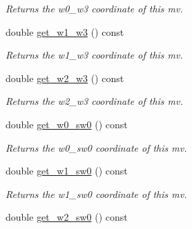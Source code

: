 \begin{DoxyCompactItemize}
\begin{DoxyCompactList}\small\item\em Returns the w0\-\_\-w3 coordinate of this mv. \end{DoxyCompactList}\item 
\hypertarget{classe3ga_1_1mv_ad4d23993e92930a758c5648d8a075906}{double \hyperlink{classe3ga_1_1mv_ad4d23993e92930a758c5648d8a075906}{get\-\_\-w1\-\_\-w3} () const }\label{classe3ga_1_1mv_ad4d23993e92930a758c5648d8a075906}

\begin{DoxyCompactList}\small\item\em Returns the w1\-\_\-w3 coordinate of this mv. \end{DoxyCompactList}\item 
\hypertarget{classe3ga_1_1mv_abb82d4e2452ad1c502a85f8ceaf8ea5b}{double \hyperlink{classe3ga_1_1mv_abb82d4e2452ad1c502a85f8ceaf8ea5b}{get\-\_\-w2\-\_\-w3} () const }\label{classe3ga_1_1mv_abb82d4e2452ad1c502a85f8ceaf8ea5b}

\begin{DoxyCompactList}\small\item\em Returns the w2\-\_\-w3 coordinate of this mv. \end{DoxyCompactList}\item 
\hypertarget{classe3ga_1_1mv_a7c407bfb8b338ae27b424d8b5bfd079c}{double \hyperlink{classe3ga_1_1mv_a7c407bfb8b338ae27b424d8b5bfd079c}{get\-\_\-w0\-\_\-sw0} () const }\label{classe3ga_1_1mv_a7c407bfb8b338ae27b424d8b5bfd079c}

\begin{DoxyCompactList}\small\item\em Returns the w0\-\_\-sw0 coordinate of this mv. \end{DoxyCompactList}\item 
\hypertarget{classe3ga_1_1mv_a79aa41ad4bcebf1cf62296d79ff11dde}{double \hyperlink{classe3ga_1_1mv_a79aa41ad4bcebf1cf62296d79ff11dde}{get\-\_\-w1\-\_\-sw0} () const }\label{classe3ga_1_1mv_a79aa41ad4bcebf1cf62296d79ff11dde}

\begin{DoxyCompactList}\small\item\em Returns the w1\-\_\-sw0 coordinate of this mv. \end{DoxyCompactList}\item 
\hypertarget{classe3ga_1_1mv_aaa3d47fee0bc786172b3da51fcf2d2ca}{double \hyperlink{classe3ga_1_1mv_aaa3d47fee0bc786172b3da51fcf2d2ca}{get\-\_\-w2\-\_\-sw0} () const }\label{classe3ga_1_1mv_aaa3d47fee0bc786172b3da51fcf2d2ca}


\end{DoxyCompactItemize}
